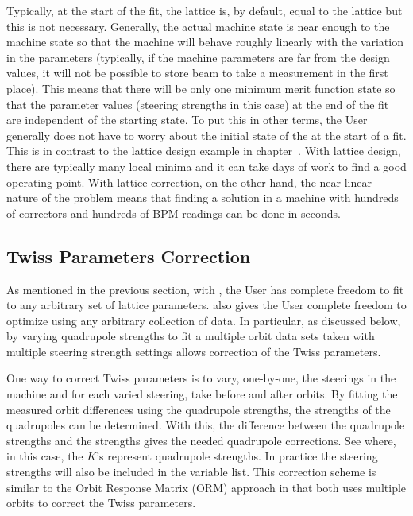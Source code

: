 \documentclass{hitec}     %
\begin{document}
{Typically, at the start of the fit, the  lattice is, by default, equal to the 
lattice but this is not necessary. Generally, the actual machine state is near enough to the
 machine state so that the machine will behave roughly linearly with the variation in the
parameters (typically, if the machine parameters are far from the design values, it will not be
possible to store beam to take a measurement in the first place). This means that there will be only
one minimum merit function state so that the parameter values (steering strengths in this case) at
the end of the fit are independent of the starting state. To put this in other terms, the User
generally does not have to worry about the initial state of the  at the start of a
fit. This is in contrast to the lattice design example in chapter~. With
lattice design, there are typically many local minima and it can take days of work to find a good
operating point. With lattice correction, on the other hand, the near linear nature of the problem
means that finding a solution in a machine with hundreds of correctors and hundreds of BPM readings
can be done in seconds.

\subsection{Twiss Parameters Correction}
\label{s:twiss.cor}

As mentioned in the previous section, with \tao, the User has complete freedom to fit to any
arbitrary set of lattice parameters. \tao also gives the User complete freedom to optimize using any
arbitrary collection of data. In particular, as discussed below, by varying quadrupole strengths to
fit a multiple orbit data sets taken with multiple steering strength settings allows correction of
the Twiss parameters.

One way to correct Twiss parameters is to vary, one-by-one, the steerings in the machine and for
each varied steering, take before and after orbits. By fitting the measured orbit differences using
the  quadrupole strengths, the strengths of the quadrupoles can be determined. With this,
the difference between the  quadrupole strengths and the  strengths gives the
needed quadrupole corrections. See  where, in this case, the $K$'s represent quadrupole
strengths. In practice the steering strengths will also be included in the variable list. This
correction scheme is similar to the Orbit Response Matrix (ORM) approach in that both uses multiple
orbits to correct the Twiss parameters.

}
\end{document}
